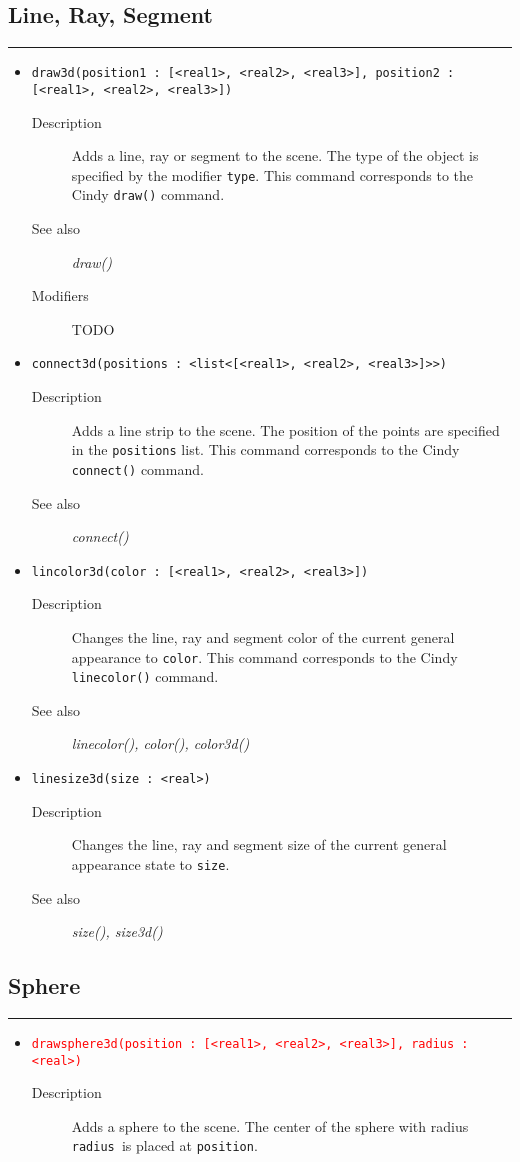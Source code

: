 \documentclass[10pt,a4widepaper]{scrartcl}
\newcommand{\csubsection}[1]{\subsection*{#1}\vspace{-0.55cm}\textcolor{CBlue}{\rule[1ex]{\textwidth}{0.4pt}}}
\newcommand{\cBlue}[1]{\textcolor{CBlue}{\texttt{#1}}}
\newcommand{\cRed}[1]{\textcolor{red}{\texttt{#1}}}
\newcommand{\desc}{\item[Description]}
\newcommand{\modi}{\item[Modifiers]}
\newcommand{\salso}{\item[See also]}
\begin{document}
\csubsection{Line, Ray, Segment}
\begin{itemize}

\item \cBlue{draw3d(position1 : [<real1>, <real2>, <real3>], position2 : [<real1>, <real2>, <real3>])}
\begin{description}
\desc Adds a line, ray or segment to the scene. The type of the object is specified by the modifier \texttt{type}. This command corresponds to the Cindy \texttt{draw()} command.
\salso \textit{draw()}
\modi TODO
\end{description}

\item \cBlue{connect3d(positions : <list<[<real1>, <real2>, <real3>]>>)}
\begin{description}
\desc Adds a line strip to the scene. The position of the points are specified in the \texttt{positions} list. This command corresponds to the Cindy \texttt{connect()} command.
\salso \textit{connect()}
\end{description}

\item \cBlue{lincolor3d(color : [<real1>, <real2>, <real3>])}
\begin{description}
\desc Changes the line, ray and segment color of the current general appearance to \texttt{color}. This command corresponds to the Cindy \texttt{linecolor()} command.
\salso \textit{linecolor(), color(), color3d()}
\end{description}

\item \cBlue{linesize3d(size : <real>)}
\begin{description}
\desc Changes the line, ray and segment size of the current general appearance state to \texttt{size}.
\salso \textit{size(), size3d()}
\end{description}
\end{itemize}

\csubsection{Sphere}
\begin{itemize}

\item \cRed{drawsphere3d(position : [<real1>, <real2>, <real3>], radius : <real>)}
\begin{description}
\desc Adds a sphere to the scene. The center of the sphere with radius \texttt{radius }is placed at \texttt{position}.
\end{description}
\end{itemize}
\end{document}
